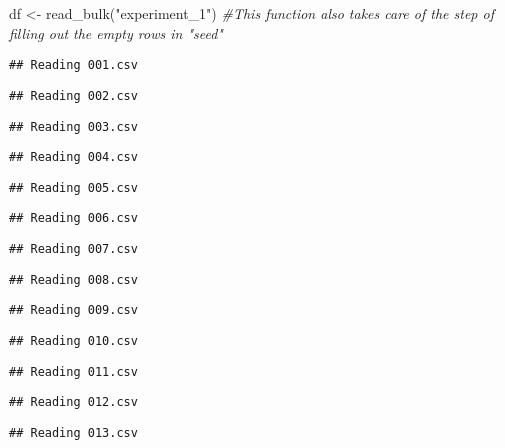 \documentclass[
]{article}
\newenvironment{Shaded}{\begin{snugshade}}{\end{snugshade}}
\newcommand{\CommentTok}[1]{\textcolor[rgb]{0.56,0.35,0.01}{\textit{#1}}}
\newcommand{\FunctionTok}[1]{\textcolor[rgb]{0.00,0.00,0.00}{#1}}
\newcommand{\NormalTok}[1]{#1}
\newcommand{\OtherTok}[1]{\textcolor[rgb]{0.56,0.35,0.01}{#1}}
\newcommand{\StringTok}[1]{\textcolor[rgb]{0.31,0.60,0.02}{#1}}
\begin{document}
\begin{Shaded}
\begin{Highlighting}[]
\NormalTok{df }\OtherTok{\textless{}{-}} \FunctionTok{read\_bulk}\NormalTok{(}\StringTok{"experiment\_1"}\NormalTok{) }\CommentTok{\#This function also takes care of the step of filling out the empty rows in "seed"}
\end{Highlighting}
\end{Shaded}

\begin{verbatim}
## Reading 001.csv
\end{verbatim}

\begin{verbatim}
## Reading 002.csv
\end{verbatim}

\begin{verbatim}
## Reading 003.csv
\end{verbatim}

\begin{verbatim}
## Reading 004.csv
\end{verbatim}

\begin{verbatim}
## Reading 005.csv
\end{verbatim}

\begin{verbatim}
## Reading 006.csv
\end{verbatim}

\begin{verbatim}
## Reading 007.csv
\end{verbatim}

\begin{verbatim}
## Reading 008.csv
\end{verbatim}

\begin{verbatim}
## Reading 009.csv
\end{verbatim}

\begin{verbatim}
## Reading 010.csv
\end{verbatim}

\begin{verbatim}
## Reading 011.csv
\end{verbatim}

\begin{verbatim}
## Reading 012.csv
\end{verbatim}

\begin{verbatim}
## Reading 013.csv
\end{verbatim}
\end{document}

